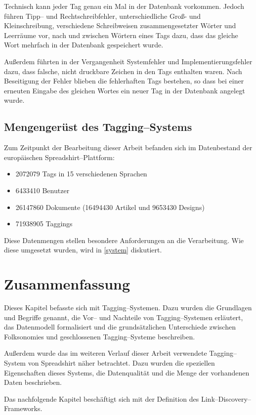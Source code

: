 Technisch kann jeder Tag genau ein Mal in der Datenbank vorkommen. Jedoch führen Tipp-- und Rechtschreibfehler, unterschiedliche Groß- und Kleinschreibung, verschiedene Schreibweisen zusammengesetzter Wörter und Leerräume vor, nach und zwischen Wörtern eines Tags dazu, dass das gleiche Wort mehrfach in der Datenbank gespeichert wurde.

Außerdem führten in der Vergangenheit Systemfehler und Implementierungsfehler dazu, dass falsche, nicht druckbare Zeichen in den Tags enthalten waren. Nach Beseitigung der Fehler blieben die fehlerhaften Tags bestehen, so dass bei einer erneuten Eingabe des gleichen Wortes ein neuer Tag in der Datenbank angelegt wurde.

\subsection{Mengengerüst des Tagging--Systems}
\label{tag_amount}

Zum Zeitpunkt der Bearbeitung dieser Arbeit befanden sich im Datenbestand der europäischen Spreadshirt--Plattform:

\begin{itemize}
    \item \num{2072079} Tags in \num{15} verschiedenen Sprachen
    \item \num{6433410} Benutzer
    \item \num{26147860} Dokumente (\num{16494430} Artikel und \num{9653430} Designs)
    \item \num{71938905} Taggings
\end{itemize}

Diese Datenmengen stellen besondere Anforderungen an die Verarbeitung. Wie diese umgesetzt wurden, wird in \cref{system} diskutiert.

\section{Zusammenfassung}

Dieses Kapitel befasste sich mit Tagging--Systemen. Dazu wurden die Grundlagen und Begriffe genannt, die Vor-- und Nachteile von Tagging--Systemen erläutert, das Datenmodell formalisiert und die grundsätzlichen Unterschiede zwischen Folksonomies und geschlossenen Tagging--Systeme beschreiben.

Außerdem wurde das im weiteren Verlauf dieser Arbeit verwendete Tagging--System von Spreadshirt \cite{sprd2013} näher betrachtet. Dazu wurden die speziellen Eigenschaften dieses Systems, die Datenqualität und die Menge der vorhandenen Daten beschrieben.

Das nachfolgende Kapitel beschäftigt sich mit der Definition des Link--Discovery--Frameworks.